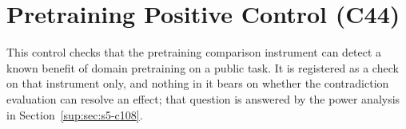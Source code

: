 \section{Pretraining Positive Control (C44)}
\label{sup:sec:s6-c44}

This control checks that the pretraining comparison instrument can detect a known benefit of
domain pretraining on a public task. It is registered as a check on that instrument only, and
nothing in it bears on whether the contradiction evaluation can resolve an effect; that question is
answered by the power analysis in Section~\ref{sup:sec:s5-c108}.



